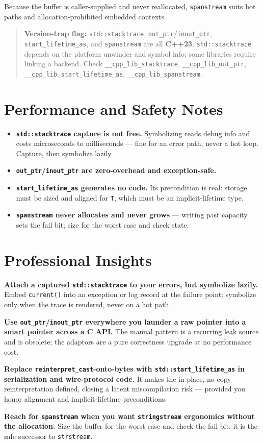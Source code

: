 Because the buffer is caller-supplied and never reallocated, \lstinline|spanstream| suits hot paths and allocation-prohibited embedded contexts.

\begin{quote}
\textbf{Version-trap flag:} \lstinline|std::stacktrace|, \lstinline|out_ptr|/\lstinline|inout_ptr|, \lstinline|start_lifetime_as|, and \lstinline|spanstream| are all \textbf{C++23}. \lstinline|std::stacktrace| depends on the platform unwinder and symbol info; some libraries require linking a backend. Check \lstinline|__cpp_lib_stacktrace|, \lstinline|__cpp_lib_out_ptr|, \lstinline|__cpp_lib_start_lifetime_as|, \lstinline|__cpp_lib_spanstream|.
\end{quote}

\section{Performance and Safety Notes}

\begin{itemize}
    \item \textbf{\lstinline|std::stacktrace| capture is not free.} Symbolizing reads debug info and costs microseconds to milliseconds --- fine for an error path, never a hot loop. Capture, then symbolize lazily.
    \item \textbf{\lstinline|out_ptr|/\lstinline|inout_ptr| are zero-overhead and exception-safe.}
    \item \textbf{\lstinline|start_lifetime_as| generates no code.} Its precondition is real: storage must be sized and aligned for \lstinline|T|, which must be an implicit-lifetime type.
    \item \textbf{\lstinline|spanstream| never allocates and never grows} --- writing past capacity sets the fail bit; size for the worst case and check state.
\end{itemize}

\section{Professional Insights}

\textbf{Attach a captured \lstinline|std::stacktrace| to your errors, but symbolize lazily.} Embed \lstinline|current()| into an exception or log record at the failure point; symbolize only when the trace is rendered, never on a hot path.

\textbf{Use \lstinline|out_ptr|/\lstinline|inout_ptr| everywhere you launder a raw pointer into a smart pointer across a C API.} The manual pattern is a recurring leak source and is obsolete; the adaptors are a pure correctness upgrade at no performance cost.

\textbf{Replace \lstinline|reinterpret_cast|-onto-bytes with \lstinline|std::start_lifetime_as| in serialization and wire-protocol code.} It makes the in-place, no-copy reinterpretation defined, closing a latent miscompilation risk --- provided you honor alignment and implicit-lifetime preconditions.

\textbf{Reach for \lstinline|spanstream| when you want \lstinline|stringstream| ergonomics without the allocation.} Size the buffer for the worst case and check the fail bit; it is the safe successor to \lstinline|strstream|.
